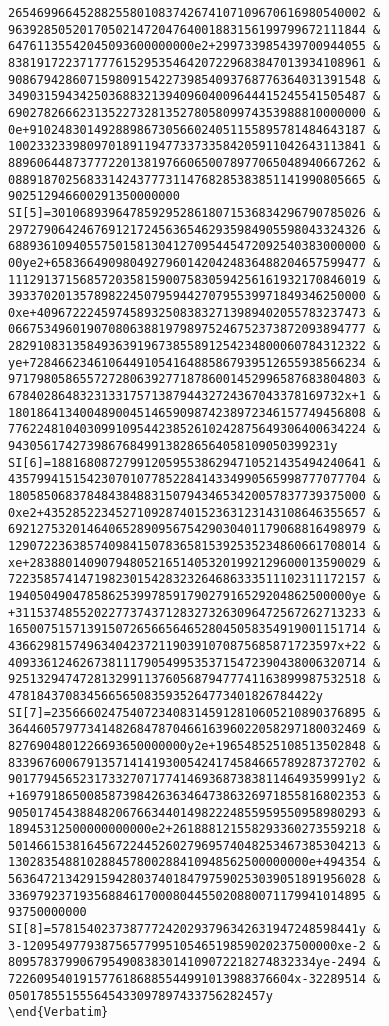\begin{verbatim}
26546996645288255801083742674107109670616980540002 &
96392850520170502147204764001883156199799672111844 &
64761135542045093600000000e2+299733985439700944055 &
83819172237177761529535464207229683847013934108961 &
90867942860715980915422739854093768776364031391548 &
34903159434250368832139409604009644415245541505487 &
69027826662313522732813527805809974353988810000000 &
0e+91024830149288986730566024051155895781484643187 &
10023323398097018911947733733584205911042643113841 &
88960644873777220138197660650078977065048940667262 &
08891870256833142437773114768285383851141990805665 &
902512946600291350000000 
SI[5]=30106893964785929528618071536834296790785026 &
29727906424676912172456365462935984905598043324326 &
68893610940557501581304127095445472092540383000000 &
00ye2+65836649098049279601420424836488204657599477 &
11129137156857203581590075830594256161932170846019 &
39337020135789822450795944270795539971849346250000 &
0xe+4096722245974589325083832713989402055783237473 &
06675349601907080638819798975246752373872093894777 &
28291083135849363919673855891254234800060784312322 &
ye+72846623461064491054164885867939512655938566234 &
97179805865572728063927718786001452996587683804803 &
67840286483231331757138794432724367043378169732x+1 &
18018641340048900451465909874238972346157749456808 &
77622481040309910954423852610242875649306400634224 &
943056174273986768499138286564058109050399231y 
SI[6]=18816808727991205955386294710521435494240641 &
43579941515423070107785228414334990565998777077704 &
18058506837848438488315079434653420057837739375000 &
0xe2+435285223452710928740152363123143108646355657 &
69212753201464065289095675429030401179068816498979 &
12907223638574098415078365815392535234860661708014 &
xe+28388014090794805216514053201992129600013590029 &
72235857414719823015428323264686333511102311172157 &
194050490478586253997859179027916529204862500000ye &
+3115374855202277374371283273263096472567262713233 &
16500751571391507265665646528045058354919001151714 &
4366298157496340423721190391070875685871723597x+22 &
40933612462673811179054995353715472390438006320714 &
92513294747281329911376056879477741163899987532518 &
4781843708345665650835935264773401826784422y 
SI[7]=23566602475407234083145912810605210890376895 &
36446057977341482684787046616396022058297180032469 &
8276904801226693650000000y2e+196548525108513502848 &
83396760067913571414193005424174584665789287372702 &
901779456523173327071774146936873838114649359991y2 &
+1697918650085873984263634647386326971855816802353 &
90501745438848206766344014982224855959550958980293 &
18945312500000000000e2+261888121558293360273559218 &
50146615381645672244526027969574048253467385304213 &
130283548810288457800288410948562500000000e+494354 &
56364721342915942803740184797590253039051891956028 &
33697923719356884617000804455020880071179941014895 &
93750000000 
SI[8]=5781540237387772420293796342631947248598441y &
3-12095497793875657799510546519859020237500000xe-2 &
8095783799067954908383014109072218274832334ye-2494 &
7226095401915776186885544991013988376604x-32289514 &
050178551555645433097897433756282457y 
\end{Verbatim} 


\end{verbatim}
